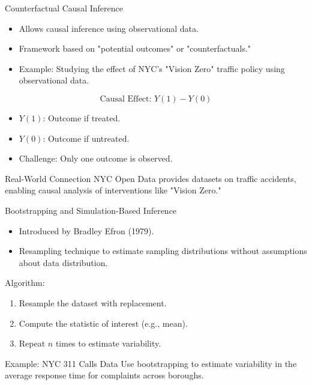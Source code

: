 \documentclass{beamer}
\begin{document}
\begin{frame}{Counterfactual Causal Inference}
\begin{itemize}
    \item Allows causal inference using observational data.
    \item Framework based on "potential outcomes" or "counterfactuals."
    \item Example: Studying the effect of NYC’s "Vision Zero" traffic policy using observational data.
\end{itemize}

\[
\text{Causal Effect: } Y(1) - Y(0)
\]
\begin{itemize}
    \item \( Y(1) \): Outcome if treated.
    \item \( Y(0) \): Outcome if untreated.
    \item Challenge: Only one outcome is observed.
\end{itemize}

\begin{block}{Real-World Connection}
NYC Open Data provides datasets on traffic accidents, enabling causal analysis of interventions like "Vision Zero."
\end{block}
\end{frame}

\begin{frame}{Bootstrapping and Simulation-Based Inference}
\begin{itemize}
    \item Introduced by Bradley Efron (1979).
    \item Resampling technique to estimate sampling distributions without assumptions about data distribution.
\end{itemize}

\begin{exampleblock}{Algorithm:}
\begin{enumerate}
    \item Resample the dataset with replacement.
    \item Compute the statistic of interest (e.g., mean).
    \item Repeat \( n \) times to estimate variability.
\end{enumerate}
\end{exampleblock}

\begin{block}{Example: NYC 311 Calls Data}
Use bootstrapping to estimate variability in the average response time for complaints across boroughs.
\end{block}
\end{frame}
\end{document}
